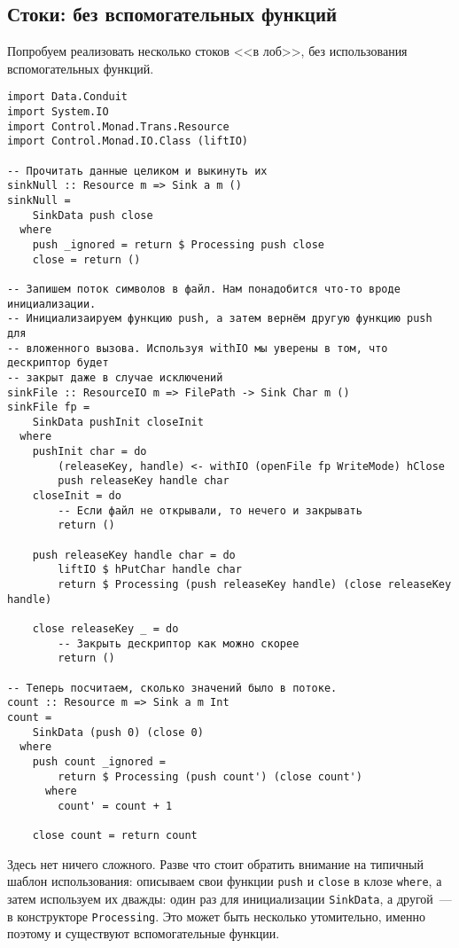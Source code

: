 \subsection{Стоки: без вспомогательных функций}
Попробуем реализовать несколько стоков <<в лоб>>, без использования вспомогательных функций.
\begin{lstlisting}
import Data.Conduit
import System.IO
import Control.Monad.Trans.Resource
import Control.Monad.IO.Class (liftIO)

-- Прочитать данные целиком и выкинуть их
sinkNull :: Resource m => Sink a m ()
sinkNull =
    SinkData push close
  where
    push _ignored = return $ Processing push close
    close = return ()

-- Запишем поток символов в файл. Нам понадобится что-то вроде инициализации.
-- Инициализаируем функцию push, а затем вернём другую функцию push для
-- вложенного вызова. Используя withIO мы уверены в том, что дескриптор будет
-- закрыт даже в случае исключений
sinkFile :: ResourceIO m => FilePath -> Sink Char m ()
sinkFile fp =
    SinkData pushInit closeInit
  where
    pushInit char = do
        (releaseKey, handle) <- withIO (openFile fp WriteMode) hClose
        push releaseKey handle char
    closeInit = do
        -- Если файл не открывали, то нечего и закрывать
        return ()

    push releaseKey handle char = do
        liftIO $ hPutChar handle char
        return $ Processing (push releaseKey handle) (close releaseKey handle)

    close releaseKey _ = do
        -- Закрыть дескриптор как можно скорее
        return ()

-- Теперь посчитаем, сколько значений было в потоке.
count :: Resource m => Sink a m Int
count =
    SinkData (push 0) (close 0)
  where
    push count _ignored =
        return $ Processing (push count') (close count')
      where
        count' = count + 1

    close count = return count
\end{lstlisting}
Здесь нет ничего сложного. Разве что стоит обратить внимание на типичный шаблон использования:
описываем свои функции \lstinline'push' и \lstinline'close' в клозе \lstinline'where', а
затем используем их дважды:
один раз для инициализации \lstinline'SinkData', а другой~--- в конструкторе
\lstinline'Processing'.
Это может быть несколько утомительно, именно поэтому и существуют вспомогательные функции.

